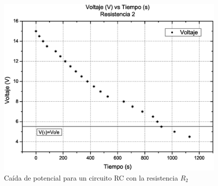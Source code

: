 \documentclass[10pt,letter]{article}
\begin{document}
\begin{figure}[H]
\centering
\includegraphics[scale=0.45]{Resistencia2}
\caption{Caída de potencial para un circuito RC con la resistencia $R_2$}
\label{RCcarga}
\end{figure}
\end{document}
